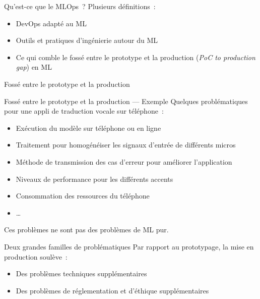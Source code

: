 \begin{frame}{Qu'est-ce que le MLOps~?}
  Plusieurs définitions~:

  \begin{itemize}
    \item DevOps adapté au ML
    \item Outils et pratiques d'ingénierie autour du ML
    \item Ce qui comble le fossé entre le prototype et la production (\textit{PoC to production gap}) en ML
  \end{itemize}
\end{frame}

\begin{frame}{Fossé entre le prototype et la production}
\end{frame}

\begin{frame}{Fossé entre le prototype et la production — Exemple}
  Quelques problématiques pour une appli de traduction vocale sur téléphone~:

  \begin{itemize}
    \item Exécution du modèle sur téléphone ou en ligne
    \item Traitement pour homogénéiser les signaux d'entrée de différents micros
    \item Méthode de transmission des cas d'erreur pour améliorer l'application
    \item Niveaux de performance pour les différents accents
    \item Consommation des ressources du téléphone
    \item …
  \end{itemize}

  Ces problèmes ne sont pas des problèmes de ML pur.
\end{frame}

\begin{frame}{Deux grandes familles de problématiques}
  Par rapport au prototypage, la mise en production soulève~:

  \begin{itemize}
    \item Des problèmes techniques supplémentaires
    \item Des problèmes de réglementation et d'éthique supplémentaires
  \end{itemize}
\end{frame}

